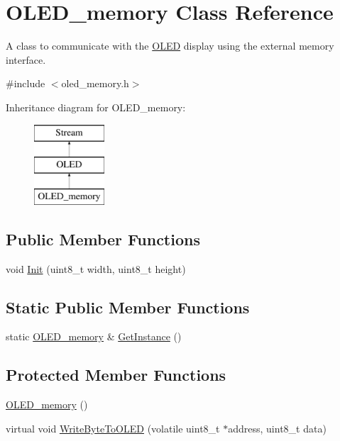 \hypertarget{class_o_l_e_d__memory}{}\section{O\+L\+E\+D\+\_\+memory Class Reference}
\label{class_o_l_e_d__memory}


A class to communicate with the \hyperlink{class_o_l_e_d}{O\+L\+ED} display using the external memory interface.  




{\ttfamily \#include $<$oled\+\_\+memory.\+h$>$}

Inheritance diagram for O\+L\+E\+D\+\_\+memory\+:\begin{figure}[H]
\begin{center}
\leavevmode
\includegraphics[height=3.000000cm]{class_o_l_e_d__memory}
\end{center}
\end{figure}
\subsection*{Public Member Functions}
\begin{DoxyCompactItemize}
\item 
void \hyperlink{class_o_l_e_d__memory_a5ad8acab1fda3221d490d49bd6aad418}{Init} (uint8\+\_\+t width, uint8\+\_\+t height)
\end{DoxyCompactItemize}
\subsection*{Static Public Member Functions}
\begin{DoxyCompactItemize}
\item 
static \hyperlink{class_o_l_e_d__memory}{O\+L\+E\+D\+\_\+memory} \& \hyperlink{class_o_l_e_d__memory_a8d20efdd852c066b46950bc7b98ff368}{Get\+Instance} ()
\end{DoxyCompactItemize}
\subsection*{Protected Member Functions}
\begin{DoxyCompactItemize}
\item 
\hyperlink{class_o_l_e_d__memory_a237da57c485eed1ba23a9752035f3973}{O\+L\+E\+D\+\_\+memory} ()
\item 
virtual void \hyperlink{class_o_l_e_d__memory_a8859cddd8c5639d43ae89bb750984291}{Write\+Byte\+To\+O\+L\+ED} (volatile uint8\+\_\+t $\ast$address, uint8\+\_\+t data)
\end{DoxyCompactItemize}
